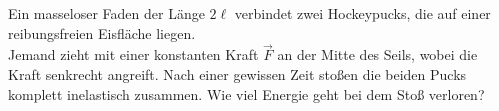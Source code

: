 \begin{minipage}[b]{0.8\textwidth}
\begin{Exercise}[title = Zwei Pucks, origin = {Morin - Classical Mechanics}, difficulty = 3, label = pucks]
Ein masseloser Faden der Länge $2\ell$ verbindet zwei Hockeypucks, die auf einer reibungsfreien Eisfläche liegen.\\
Jemand zieht mit einer konstanten Kraft $\vec{F}$ an der Mitte des Seils, wobei die Kraft senkrecht angreift.
Nach einer gewissen Zeit stoßen die beiden Pucks komplett inelastisch zusammen. Wie viel Energie geht bei dem Stoß verloren?
\end{Exercise}
\end{minipage}
\hfill
\begin{minipage}[b]{.2\textwidth}
\centering
{}
\end{minipage}

